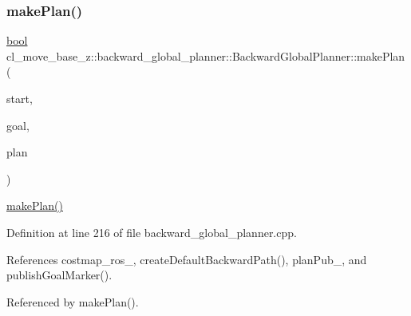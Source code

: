 \mbox{\label{classcl__move__base__z_1_1backward__global__planner_1_1BackwardGlobalPlanner_a3f1f3c81e7c52c9305544fd793741a41}} 
\subsubsection{\texorpdfstring{make\+Plan()}{makePlan()}\hspace{0.1cm}{\footnotesize\ttfamily [1/2]}}
{\footnotesize\ttfamily \hyperlink{classbool}{bool} cl\+\_\+move\+\_\+base\+\_\+z\+::backward\+\_\+global\+\_\+planner\+::\+Backward\+Global\+Planner\+::make\+Plan (\begin{DoxyParamCaption}\item[{const geometry\+\_\+msgs\+::\+Pose\+Stamped \&}]{start,  }\item[{const geometry\+\_\+msgs\+::\+Pose\+Stamped \&}]{goal,  }\item[{std\+::vector$<$ geometry\+\_\+msgs\+::\+Pose\+Stamped $>$ \&}]{plan }\end{DoxyParamCaption})}

\hyperlink{classcl__move__base__z_1_1backward__global__planner_1_1BackwardGlobalPlanner_a3f1f3c81e7c52c9305544fd793741a41}{make\+Plan()} 

Definition at line 216 of file backward\+\_\+global\+\_\+planner.\+cpp.



References costmap\+\_\+ros\+\_\+, create\+Default\+Backward\+Path(), plan\+Pub\+\_\+, and publish\+Goal\+Marker().



Referenced by make\+Plan().


